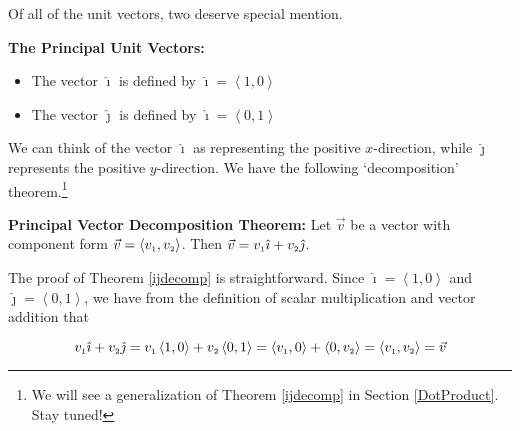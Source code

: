 Of all of the unit vectors, two deserve special mention.

\smallskip

\colorbox{ResultColor}{\bbm

\begin{defn} \label{ihatjhatdefn}  \textbf{The Principal Unit Vectors:} $~$   

\begin{itemize}

\item The vector $\hat{\imath}$ is defined by $\hat{\imath} = \left<1,0\right>$

\item The vector $\hat{\jmath}$ is defined by $\hat{\imath} = \left<0,1\right>$

\end{itemize}


\end{defn}

\ebm}

\smallskip

We can think of the vector $\hat{\imath}$ as representing the positive $x$-direction, while $\hat{\jmath}$ represents the positive $y$-direction.  We have the following `decomposition' theorem.\footnote{We will see a generalization of Theorem \ref{ijdecomp} in Section \ref{DotProduct}.  Stay tuned!}  

\smallskip

\colorbox{ResultColor}{\bbm

\begin{thm} \label{ijdecomp}  \textbf{Principal Vector Decomposition Theorem:}  Let $\vec{v}$ be a vector with component form  $\vec{v} = \left< v_{\mbox{\tiny $1$}} ,v_{\mbox{\tiny $2$}}\right>$. Then $\vec{v} = v_{\mbox{\tiny $1$}} \hat{\imath} + v_{\mbox{\tiny $2$}} \hat{\jmath}$. 


\end{thm}

\ebm}

\smallskip

The proof of Theorem \ref{ijdecomp} is straightforward. Since $\hat{\imath} = \left<1,0\right>$ and $\hat{\jmath} = \left< 0,1\right>$, we have from the definition of scalar multiplication and vector addition that  

\[v_{\mbox{\tiny $1$}} \hat{\imath} + v_{\mbox{\tiny $2$}} \hat{\jmath} = v_{\mbox{\tiny $1$}}\left<1,0\right> + v_{\mbox{\tiny $2$}}\left<0,1\right> = \left<v_{\mbox{\tiny $1$}},0\right> + \left<0,v_{\mbox{\tiny $2$}}\right> = \left<v_{\mbox{\tiny $1$}},v_{\mbox{\tiny $2$}}\right> = \vec{v}\]

